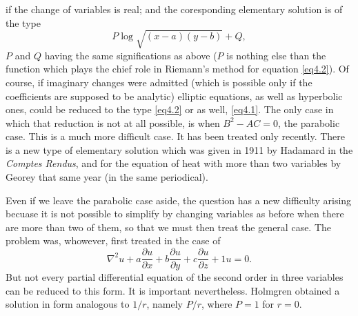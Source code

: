 \documentclass[12pt,oneside]{book}
\begin{document}
if the change of variables is real; and the coresponding elementary solution is of the type
$$P\log\sqrt{(x-a)(y-b)}+Q,$$
$P$ and $Q$ having the same significations as above ($P$ is nothing else than the function which plays the chief role in Riemann's method for equation \eqref{eq4.2}). Of course, if imaginary changes were admitted (which is possible only if the coefficients are supposed to be analytic) elliptic equations, as well as hyperbolic ones, could be reduced to the type \eqref{eq4.2} or as well, \eqref{eq4.1}. The only case in which that reduction is not at all possible, is when $B^2-AC=0$, the parabolic case. This is a much more difficult case. It has been treated only recently. There is a new type of elementary solution which was given in 1911 by Hadamard in the \textit{Comptes Rendus}, and for the equation of heat with more than two variables by Georey that same year (in the same periodical). \par

Even if we leave the parabolic case aside, the question has a new difficulty arising becuase it is not possible to simplify by changing variables as before when there are more than two of them, so that we must then treat the general case. The problem was, whowever, first treated in the case of
$$\nabla^2u+a\frac{\partial u}{\partial x}+b\frac{\partial u}{\partial y}+c\frac{\partial u}{\partial z}+1u=0.$$
But not every partial differential equation of the second order in three variables can be reduced to this form. It is important nevertheless. Holmgren obtained a solution in form analogous to $1/r$, namely $P/r$, where $P=1$ for $r=0$. \par
\end{document}
